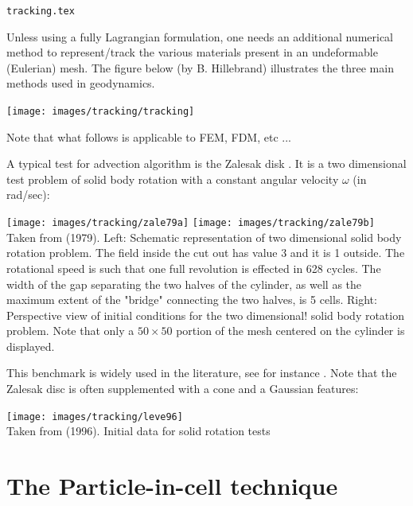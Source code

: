 \begin{flushright} {\tiny {\color{gray} \tt tracking.tex}} \end{flushright}

Unless using a fully Lagrangian formulation, one needs an additional numerical method to represent/track
the various materials present in an undeformable (Eulerian) mesh.
The figure below (by B. Hillebrand) illustrates the three main methods used in geodynamics.

\begin{center}
\texttt{[image: images/tracking/tracking]}
\end{center}

Note that what follows is applicable to FEM, FDM, etc ...

A typical test for advection algorithm is the Zalesak disk \cite{zale79}. It is a two dimensional test 
problem of solid body rotation with a constant angular velocity $\omega$ (in rad/sec):

\begin{center}
\texttt{[image: images/tracking/zale79a]}
\texttt{[image: images/tracking/zale79b]}\\
{\captionfont Taken from \textcite{zale79} (1979). Left: Schematic representation of two dimensional 
solid body rotation problem. The field inside the cut out has value 3 and it is 1
outside. The rotational speed is such that one full revolution is effected in 
628 cycles. The width of the gap separating the two halves of the cylinder,
as well as the maximum extent of the "bridge" connecting the two halves, is 5 cells.
Right: Perspective view of initial conditions for the two dimensional! solid body rotation
problem. Note that only a $50\times50$ portion of the mesh centered on the cylinder is displayed.}
\end{center}

This benchmark is widely used in the literature, see for instance \cite{stco91,supu00,vasv05,dilp06,basd08,zhbl14}.
Note that the Zalesak disc is often supplemented with a cone and a Gaussian features:

\begin{center}
\texttt{[image: images/tracking/leve96]}\\
{\captionfont Taken from \textcite{leve96} (1996). Initial data for solid rotation tests}
\end{center}

\section{The Particle-in-cell technique}\label{ss:pic}

